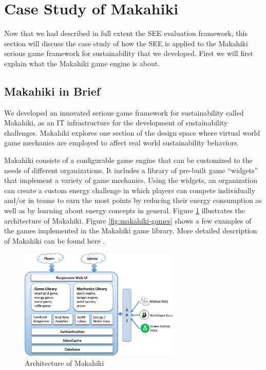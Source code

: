 \documentclass{sigchi}
\begin{document}
\section{Case Study of Makahiki}
Now that we had described in full extent the SEE evaluation framework, this section will discuss the case study of how the SEE is applied to the Makahiki serious game framework for sustainability that we developed. First we will first explain what the Makahiki game engine is about.

\subsection{Makahiki in Brief}

We developed an innovated serious game framework for sustainability called Makahiki, as an IT infrastructure for the development of sustainability challenges. Makahiki explores one section of the design space
where virtual world game mechanics are employed to affect real world sustainability behaviors.

Makahiki consists of a configurable game engine that can be customized to the needs of different organizations.  It includes a library of pre-built game ``widgets'' that implement a variety of game mechanics.  Using the widgets, an organization can create a custom energy challenge in which players can compete individually and/or in teams to earn the most points by reducing their energy consumption as well as by learning about energy concepts in general. Figure \ref{fig:makahiki-architecture} illustrates the architecture of Makahiki. Figure \ref{fig:makahiki-games} shows a few examples of the games implemented in the Makahiki game library. More detailed description of Makahiki can be found here \cite{csdl2-12-06}.

\begin{figure}
  \center
  \includegraphics[width=3in]{makahiki-system-architecture}
  \caption{Architecture of Makahiki}
  \label{fig:makahiki-architecture}
\end{figure}
\end{document}
